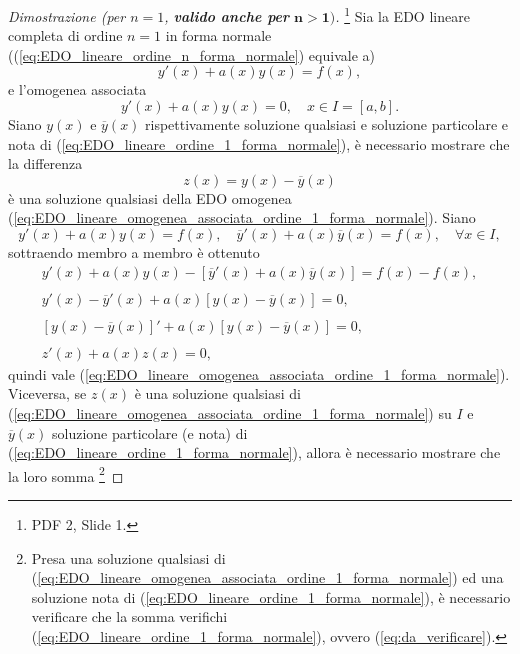 \begin{proof}[Dimostrazione (per $n=1$, \textbf{valido anche per} $\boldsymbol{n>1)}$]\footnote{PDF 2, Slide 1.}
     Sia la EDO lineare completa di ordine $n=1$ in forma normale ((\ref{eq:EDO_lineare_ordine_n_forma_normale}) equivale a)
    \begin{equation}\label{eq:EDO_lineare_ordine_1_forma_normale}
       y'(x)+a(x)y(x)=f(x),
    \end{equation}
    e l'omogenea associata
    \begin{equation}\label{eq:EDO_lineare_omogenea_associata_ordine_1_forma_normale}
        y'(x)+a(x)y(x)=0,\quad x\in I=[a,b].
    \end{equation}
    Siano $y(x)$ e $\overline{y}(x)$ rispettivamente soluzione qualsiasi e soluzione particolare e nota di (\ref{eq:EDO_lineare_ordine_1_forma_normale}), è necessario mostrare che la differenza
    \begin{equation*}
        z(x)=y(x)-\overline{y}(x)
    \end{equation*}
    è una soluzione qualsiasi della EDO omogenea (\ref{eq:EDO_lineare_omogenea_associata_ordine_1_forma_normale}). Siano
    \begin{equation*}
        y'(x)+a(x)y(x)=f(x),\quad \overline{y}'(x) +a(x)\overline{y}(x)=f(x),\quad \forall x\in I,
    \end{equation*}
    sottraendo membro a membro è ottenuto
    \begin{equation*}
        \begin{matrix}
            y'(x)+a(x)y(x) - [\overline{y}'(x) +a(x)\overline{y}(x)] =f(x)-f(x),\\\\
            y'(x) - \overline{y}'(x)+a(x)[y(x)-\overline{y}(x)]=0,\\\\
            [y(x)-\overline{y}(x)]'+a(x)[y(x)-\overline{y}(x)]=0,\\\\
            z'(x) + a(x) z(x) = 0,
        \end{matrix}
    \end{equation*}
    quindi vale (\ref{eq:EDO_lineare_omogenea_associata_ordine_1_forma_normale}).\\
    Viceversa, se $z(x)$ è una soluzione qualsiasi di (\ref{eq:EDO_lineare_omogenea_associata_ordine_1_forma_normale}) su $I$ e $\overline{y}(x)$ soluzione particolare (e nota) di (\ref{eq:EDO_lineare_ordine_1_forma_normale}), allora è necessario mostrare che la loro somma \footnote{Presa una soluzione qualsiasi di (\ref{eq:EDO_lineare_omogenea_associata_ordine_1_forma_normale}) ed una soluzione nota di (\ref{eq:EDO_lineare_ordine_1_forma_normale}), è necessario verificare che la somma verifichi (\ref{eq:EDO_lineare_ordine_1_forma_normale}), ovvero (\ref{eq:da_verificare}).}

\end{proof}
